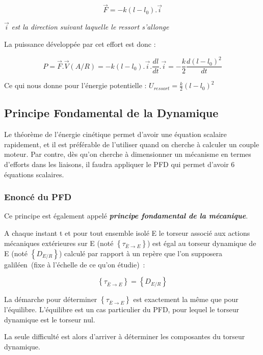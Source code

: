 \[\overrightarrow{F} = - k(l - l_{0}).\overrightarrow{i}\]

\(\overrightarrow{i}\) \emph{est la direction suivant laquelle le ressort s'allonge}

La puissance développée par cet effort est donc :

\[P = \overrightarrow{F}.\overrightarrow{V}(A/R) = - k(l - l_{0}).\overrightarrow{i}.\frac{dl}{dt}.\overrightarrow{i} = - \frac{k}{2}\frac{d(l - l_{0})^{2}}{dt}\]

Ce qui nous donne pour l'énergie potentielle : \(U_{ressort} = \frac{k}{2}(l - l_{0})^{2}\)

\hypertarget{principe-fondamental-de-la-dynamique}{%
\subsection{Principe Fondamental de la Dynamique}\label{principe-fondamental-de-la-dynamique}}

Le théorème de l'énergie cinétique permet d'avoir une équation scalaire rapidement, et il est préférable de l'utiliser quand on cherche à calculer un couple moteur. Par contre, dès qu'on cherche à dimensionner un mécanisme en termes d'efforts dans les liaisons, il faudra appliquer le PFD qui permet d'avoir 6 équations scalaires.

\hypertarget{enoncuxe9-du-pfd}{%
\subsubsection{Enoncé du PFD}\label{enoncuxe9-du-pfd}}

Ce principe est également appelé \textbf{\emph{principe fondamental de la mécanique}}.

A chaque instant t et pour tout ensemble isolé E le torseur associé aux actions mécaniques extérieures sur E (noté \(\left\{ \tau_{\overline{E} \rightarrow E} \right\}\)) est égal au torseur dynamique de E (noté \(\left\{ D_{E/R} \right\}\)) calculé par rapport à un repère que l'on supposera galiléen~(fixe à l'échelle de ce qu'on étudie)~:

\[\left\{ \tau_{\overline{E} \rightarrow E} \right\} = \left\{ D_{E/R} \right\}\]

La démarche pour déterminer \(\left\{ \tau_{\overline{E} \rightarrow E} \right\}\) est exactement la même que pour l'équilibre. L'équilibre est un cas particulier du PFD, pour lequel le torseur dynamique est le torseur nul.

La seule difficulté est alors d'arriver à déterminer les composantes du torseur dynamique.


